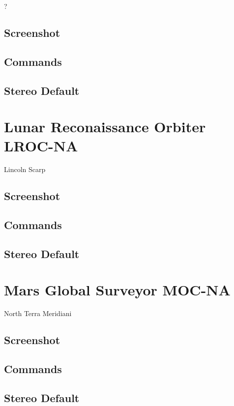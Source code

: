 ?

\subsection{Screenshot}

\subsection{Commands}

\subsection{Stereo Default}

\section{Lunar Reconaissance Orbiter LROC-NA}

Lincoln Scarp

\subsection{Screenshot}

\subsection{Commands}

\subsection{Stereo Default}

\section{Mars Global Surveyor MOC-NA}

North Terra Meridiani

\subsection{Screenshot}

\subsection{Commands}

\subsection{Stereo Default}

